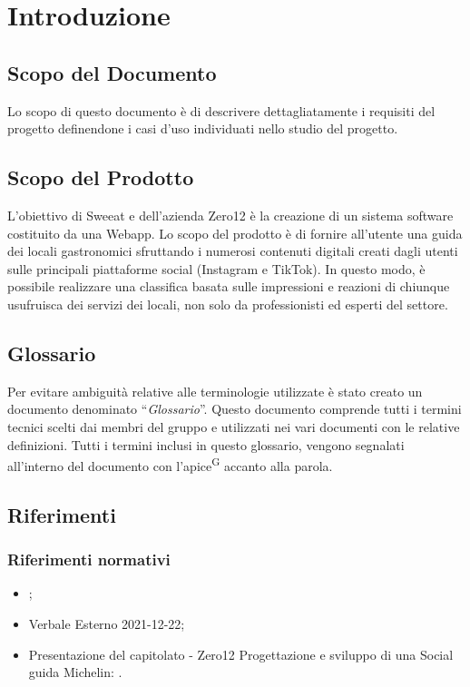 \section{Introduzione}

\subsection{Scopo del Documento}
Lo scopo di questo documento è di descrivere dettagliatamente i requisiti del progetto definendone i casi d’uso individuati nello studio del progetto.

\subsection{Scopo del Prodotto}

L’obiettivo di Sweeat e dell’azienda Zero12 è la creazione di un sistema software costituito da una Webapp. Lo scopo del prodotto è di fornire all’utente una guida dei locali gastronomici sfruttando i numerosi contenuti digitali creati dagli utenti sulle principali piattaforme social (Instagram e TikTok). In questo modo, è possibile realizzare una classifica basata sulle impressioni e reazioni di chiunque usufruisca dei servizi dei locali, non solo da professionisti ed esperti del settore.

\subsection{Glossario}

Per evitare ambiguità relative alle terminologie utilizzate è stato creato un documento denominato “\textit{Glossario}”. Questo documento comprende tutti i termini tecnici scelti dai membri del gruppo e utilizzati nei vari documenti con le relative definizioni. Tutti i termini inclusi in questo glossario, vengono segnalati all’interno del documento con l’apice\textsuperscript{G} accanto alla parola.

\subsection{Riferimenti}

\subsubsection{Riferimenti normativi}
\begin{itemize}
    \item \NdP{};
    \item Verbale Esterno 2021-12-22;
    \item Presentazione del capitolato - Zero12 Progettazione e sviluppo di una Social guida Michelin: \newline {}.
\end{itemize}
